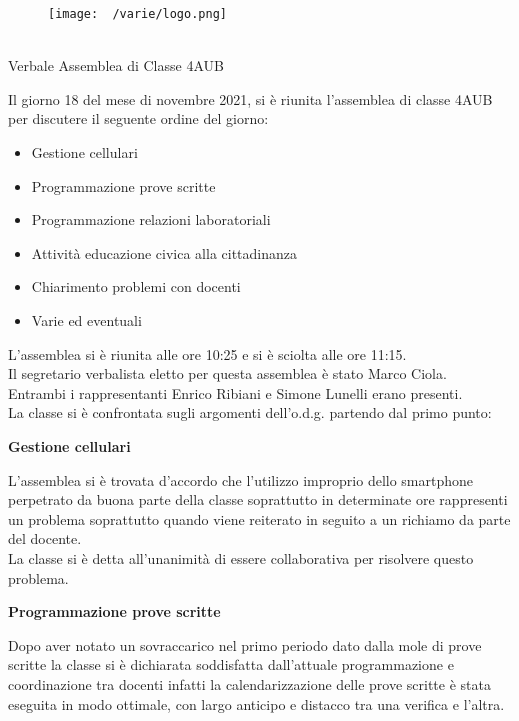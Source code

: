 \documentclass{article}
\begin{document}
\begin{center}
    \begin{figure}
        \texttt{[image: ~/varie/logo.png]}
    \end{figure}
\end{center}
\hline\\

\vspace{1cm}
\Huge Verbale Assemblea di Classe 4AUB\\
\vspace{0.5cm}
\begin{flushleft}
    \normalsize
    Il giorno 18 del mese di novembre 2021, si è riunita l'assemblea di classe 4AUB per discutere il seguente 
    ordine del giorno:
    \begin{itemize}
        \item Gestione cellulari
        \item Programmazione prove scritte
        \item Programmazione relazioni laboratoriali
        \item Attività educazione civica alla cittadinanza
        \item Chiarimento problemi con docenti 
        \item Varie ed eventuali
    \end{itemize}
\vspace{1cm}
L'assemblea si è riunita alle ore 10:25 e si è sciolta alle ore 11:15.\\
Il segretario verbalista eletto per questa assemblea è stato Marco Ciola.\\
Entrambi i rappresentanti Enrico Ribiani e Simone Lunelli erano presenti.\\
\vspace{0.5 cm}
La classe si è confrontata sugli argomenti dell'o.d.g. partendo dal primo punto:
\begin{center}
    \large \textbf{Gestione cellulari}
\end{center}
L'assemblea si è trovata d'accordo che l'utilizzo improprio dello smartphone perpetrato da buona parte della
classe soprattutto in determinate ore rappresenti un problema soprattutto quando viene reiterato in seguito 
a un richiamo da parte del docente.\\
La classe si è detta all'unanimità di essere collaborativa per risolvere questo problema.\\
\vspace{0.2 cm}

\begin{center}
    \large \textbf{Programmazione prove scritte}
\end{center}
Dopo aver notato un sovraccarico nel primo periodo dato dalla mole di prove scritte la classe si è dichiarata
soddisfatta dall'attuale programmazione e coordinazione tra docenti infatti la calendarizzazione delle prove 
scritte è stata eseguita in modo ottimale, con largo anticipo e distacco tra una verifica e l'altra.\\
\vspace{0.2 cm}


\end{flushleft}
\end{document}
